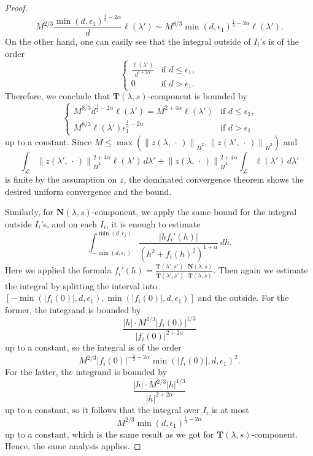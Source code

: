 \documentclass[reqno,centertags,12pt]{amsart}
\theoremstyle{definition}
\numberwithin{equation}{section}
\newcommand{\abs}[1]{\left\lvert#1\right\rvert}
\newcommand{\norm}[1]{\left\|#1\right\|}
\begin{document}
\begin{proof}
    \[
        M^{2/3}
        \frac{\min(d,\epsilon_{1})^{\frac{1}{3}-2\alpha}}{d}\ell(\lambda')
        \sim M^{8/3}
        \min(d,\epsilon_{1})^{\frac{1}{3}-2\alpha}\ell(\lambda').
    \]
    On the other hand, one can easily see that the integral outside of $I_{i}$'s
    is of the order
    \[
        \begin{cases}
            \frac{\ell(\lambda')}{d^{1+2\alpha}}
            &\textrm{if $d\leq\epsilon_{1}$}, \\
            0 &\textrm{if $d>\epsilon_{1}$}.
        \end{cases}
    \]
    Therefore, we conclude that $\mathbf{T}(\lambda,s)$-component is bounded by
    \[
        \begin{cases}
            M^{8/3}d^{\frac{1}{3}-2\alpha}\ell(\lambda')
            = M^{2+4\alpha}\ell(\lambda')
            &\textrm{if $d\leq \epsilon_{1}$,} \\
            M^{8/3}\ell(\lambda')
            \epsilon_{1}^{\frac{1}{3}-2\alpha}
            &\textrm{if $d>\epsilon_{1}$}
        \end{cases}
    \]
    up to a constant. Since $M\leq \max\left(
        \norm{z(\lambda,\,\cdot\,)}_{\dot{H}^{2}},
        \norm{z(\lambda',\,\cdot\,)}_{\dot{H}^{2}}
    \right)$ and
    \[
        \int_{\mathcal{L}}
        \norm{z(\lambda',\,\cdot\,)}_{\dot{H}^{2}}^{2+4\alpha}\ell(\lambda')\,d\lambda'
        + \norm{z(\lambda,\,\cdot\,)}_{\dot{H}^{2}}^{2+4\alpha}
        \int_{\mathcal{L}}\ell(\lambda')\,d\lambda'
    \]
    is finite by the assumption on $z$, the dominated convergence theorem shows
    the desired uniform convergence and the bound.

    Similarly, for $\mathbf{N}(\lambda,s)$-component, we apply the same bound for
    the integral outside $I_{i}$'s, and on each $I_{i}$, it is enough to estimate
    \[
        \int_{-\min(d,\epsilon_{1})}^{\min(d,\epsilon_{1})}
        \frac{\abs{hf_{i}'(h)}}{(h^{2}+f_{i}(h)^{2})^{1+\alpha}}\,dh.
    \]
    Here we applied the formula
    $f_{i}'(h) = \frac{\mathbf{T}(\lambda',s')\cdot\mathbf{N}(\lambda,s)}
    {\mathbf{T}(\lambda',s')\cdot\mathbf{T}(\lambda,s)}$.
    Then again we estimate the integral by splitting the interval into
    $[-\min(\abs{f_{i}(0)},d,\epsilon_{1}),\min(\abs{f_{i}(0)},d,\epsilon_{1})]$
    and the outside. For the former, the integrand is bounded by
    \[
        \frac{\abs{h}\cdot M^{2/3}\abs{f_{i}(0)}^{1/3}}
        {\abs{f_{i}(0)}^{2+2\alpha}}
    \]
    up to a constant, so the integral is of the order
    \[
        M^{2/3}\abs{f_{i}(0)}^{-\frac{5}{3}-2\alpha}
        \min(\abs{f_{i}(0)},d,\epsilon_{1})^{2}.
    \]
    For the latter, the integrand is bounded by
    \[
        \frac{\abs{h}\cdot M^{2/3}\abs{h}^{1/3}}
        {\abs{h}^{2+2\alpha}}
    \]
    up to a constant, so it follows that the integral over $I_{i}$ is at most
    \[
        M^{2/3}\min(d,\epsilon_{1})^{\frac{1}{3}-2\alpha}
    \]
    up to a constant, which is the same result as we got for
    $\mathbf{T}(\lambda,s)$-component. Hence, the same analysis applies.
\end{proof}
\end{document}
